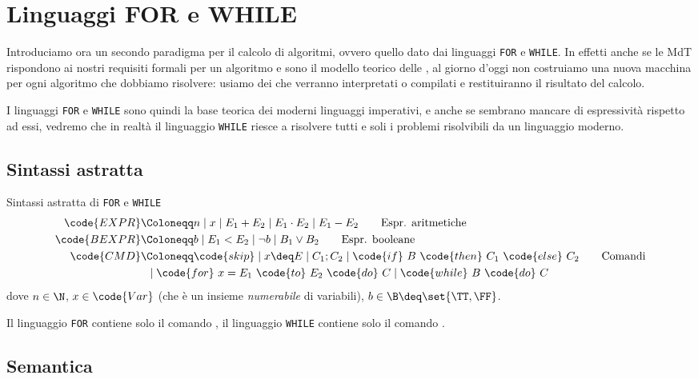 \section{Linguaggi FOR e WHILE}

Introduciamo ora un secondo paradigma per il calcolo di algoritmi, ovvero quello dato dai linguaggi \texttt{FOR} e \texttt{WHILE}. In effetti anche se le MdT rispondono ai nostri requisiti formali per un algoritmo e sono il modello teorico delle , al giorno d'oggi non costruiamo una nuova macchina per ogni algoritmo che dobbiamo risolvere: usiamo dei  che verranno interpretati o compilati e restituiranno il risultato del calcolo.

I linguaggi \texttt{FOR} e \texttt{WHILE} sono quindi la base teorica dei moderni linguaggi imperativi, e anche se sembrano mancare di espressività rispetto ad essi, vedremo che in realtà il linguaggio \texttt{WHILE} riesce a risolvere tutti e soli i problemi risolvibili da un linguaggio moderno.

\subsection*{Sintassi astratta}

\begin{definition}
    {Sintassi astratta di \texttt{FOR} e \texttt{WHILE}}{}
    \begin{align}
        \code{EXPR} &\Coloneqq n \mid x \mid E_1 + E_2 \mid E_1 \cdot E_2 \mid E_1 - E_2 \tag*{Espr. aritmetiche}\\
        \code{BEXPR} &\Coloneqq b \mid E_1 < E_2 \mid \neg b \mid B_1 \lor B_2 \tag*{Espr. booleane} \\
        \code{CMD} &\Coloneqq \code{skip} \mid x \deq E \mid C_1;C_2 \mid \code{if}\ B\ \code{then}\ C_1\ \code{else}\ C_2 \tag*{Comandi} \\
        &\;\;\mid \code{for}\ x = E_1\ \code{to}\ E_2\ \code{do}\ C \mid \code{while}\ B\ \code{do}\ C \tag*{}
    \end{align}
    dove $n \in \N$, $x \in \code{Var}$ (che è un insieme \emph{numerabile} di variabili), $b \in \B \deq \set{\TT, \FF}$. 

    Il linguaggio \texttt{FOR} contiene solo il comando , il linguaggio \texttt{WHILE} contiene solo il comando .
\end{definition}

\subsection*{Semantica}

